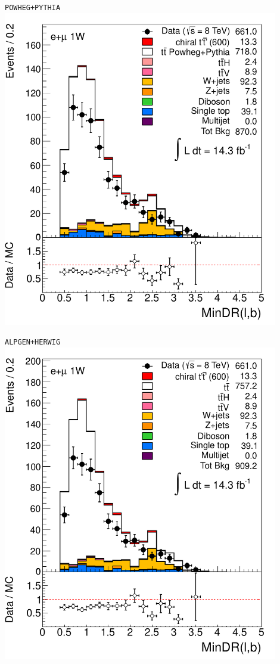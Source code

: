 \begin{frame}
\begin{minipage}{.33\textwidth}
\end{minipage}\begin{minipage}{.33\textwidth}\centering
\texttt{POWHEG+PYTHIA} \\
\includegraphics[width=0.9\textwidth]{pics/wbxgen/ttbar117050/VLQAna_WbX_MinDRlb_ELEMUONCR2_1W_NOMINAL}


\end{minipage}\begin{minipage}{.33\textwidth}\centering
\texttt{ALPGEN+HERWIG}\\
\includegraphics[width=0.9\textwidth]{pics/wbxgen/ttbarAlpgen_HFOR/VLQAna_WbX_MinDRlb_ELEMUONCR2_1W_NOMINAL}



\end{minipage}
\end{frame}
